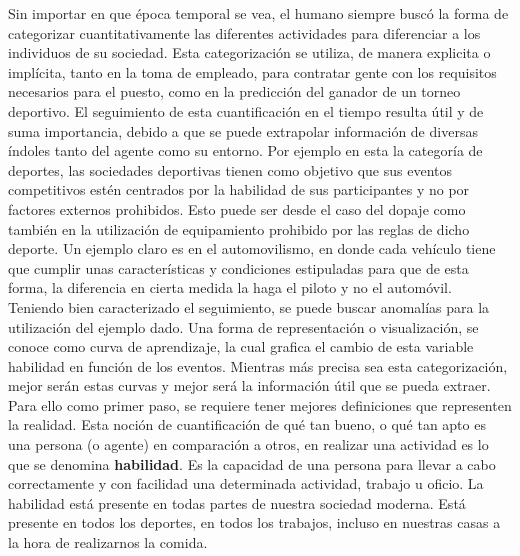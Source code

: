 \documentclass[11pt,twoside, spanish]{report} %
\begin{document}
Sin importar en que \'epoca temporal se vea, el humano siempre busc\'o la forma de categorizar cuantitativamente las diferentes actividades para diferenciar a los individuos de su sociedad.
Esta categorizaci\'on se utiliza, de manera explicita o impl\'icita, tanto en la toma de empleado, para contratar gente con los requisitos necesarios para el puesto, como en la predicci\'on del ganador de un torneo deportivo.
El seguimiento de esta cuantificaci\'on en el tiempo resulta \'util  y de suma importancia, debido a que se puede extrapolar informaci\'on de diversas \'indoles tanto del agente como su entorno.
Por ejemplo en esta la categor\'ia de deportes, las sociedades deportivas tienen como objetivo que sus eventos competitivos est\'en centrados por la habilidad de sus participantes y no por factores externos prohibidos.
Esto puede ser desde el caso del dopaje como tambi\'en en la utilizaci\'on de equipamiento prohibido por las reglas de dicho deporte.
Un ejemplo claro es en el automovilismo, en donde cada veh\'iculo tiene que cumplir unas caracter\'isticas y condiciones estipuladas para que de esta forma, la diferencia en cierta medida la haga el piloto y no el autom\'ovil.
Teniendo bien caracterizado el seguimiento, se puede buscar anomal\'ias para la utilizaci\'on del ejemplo dado.
Una forma de representaci\'on o visualizaci\'on, se conoce como curva de aprendizaje, la cual grafica el cambio de esta variable habilidad en funci\'on de los eventos.
Mientras m\'as precisa sea esta categorizaci\'on, mejor ser\'an estas curvas y mejor ser\'a la informaci\'on \'util que se pueda extraer.
Para ello como primer paso, se requiere tener mejores definiciones que representen la realidad.
Esta noci\'on de cuantificaci\'on de qu\'e tan bueno, o qu\'e tan apto es una persona (o agente) en comparaci\'on a otros, en realizar una actividad es lo que se denomina \textbf{habilidad}.
Es la capacidad de una persona para llevar a cabo correctamente y con facilidad una determinada actividad, trabajo u oficio.
La habilidad est\'a presente en todas partes de nuestra sociedad moderna.
Est\'a presente en todos los deportes, en todos los trabajos, incluso en nuestras casas a la hora de realizarnos la comida.
\end{document}
